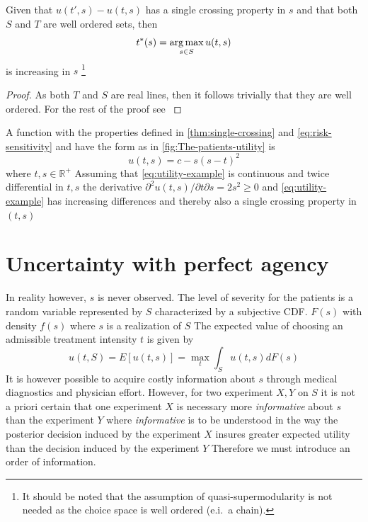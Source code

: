 \documentclass[10pt,a4paper]{article} 					%
\begin{document}
\begin{prop}
Given that \(u(t',s)-u(t,s)\) has a single crossing property in \(s\) and that both \(S\) and \(T\) are well ordered sets, then
\[
	t^{*}(s)=\argmax_{s\in S}u(t,s)\label{eq:increasing-solution}
\]
is increasing in \(s\) \footnote{It should be noted that the assumption of quasi-supermodularity is not needed as the choice space is well ordered (e.i.\ a chain).}
\end{prop}

\begin{proof}
As both \(T\) and \(S\) are real lines, then it follows trivially that they are well ordered. For the rest of the proof see \textcite{Milgrom1994}
\end{proof}

\begin{example}
A function with the properties defined in \cref{thm:single-crossing} and \cref{eq:risk-sensitivity} and have the form as in \cref{fig:The-patients-utility} is
\[
	u(t,s) = c-s{(s-t)}^{2}\label{eq:utility-example}
\]
where \(t,s\in\mathbb{R}^{+}\)  Assuming that \cref{eq:utility-example} is continuous and twice differential in \(t,s\)  the derivative \(\partial^{2}u(t,s)\big/\partial t\partial s=2s^{2}\ge0\) and \cref{eq:utility-example} has increasing differences and thereby also a single crossing property in \((t,s)\)
\end{example}


\section{Uncertainty with perfect agency}

In reality however, \(s\) is never observed. The level of severity for the patients is a random variable represented by \(S\)  characterized by a subjective CDF. \(F(s)\)  with density \(f(s)\)  where \(s\) is a realization of \(S\)  The expected value of choosing an admissible treatment intensity \(t\) is given by
\[
	u(t,S)=E[u(t,s)]=\max_{t}\int_{S}u(t,s)dF(s)\label{eq:expected-utility-prior}
\]
It is however possible to acquire costly information about \(s\) through medical diagnostics and physician effort. However, for two experiment \(X,Y\) on \(S\)  it is not a priori certain that one experiment \(X\) is necessary more \emph{informative} about \(s\) than the experiment \(Y\)  where \emph{informative} is to be understood in the way the posterior decision induced by the experiment \(X\) insures greater expected utility than the decision induced by the experiment \(Y\)  Therefore we must introduce an order of information.
\end{document}
